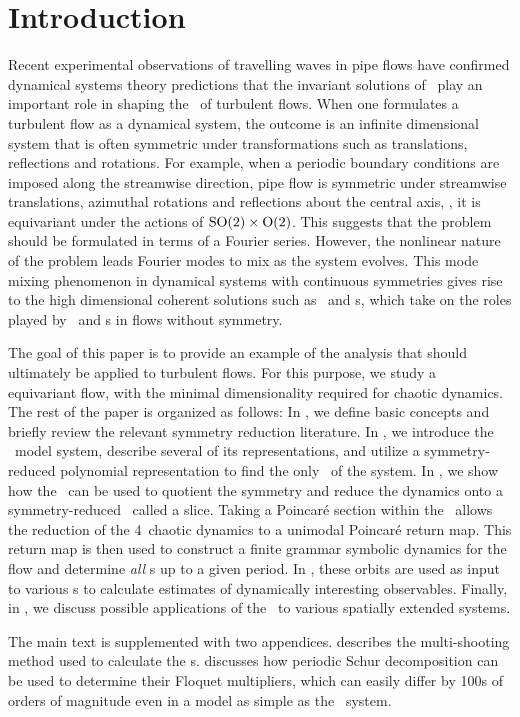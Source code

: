 \section{Introduction}
\label{s:intro}

Recent experimental observations of travelling waves in pipe flows have
confirmed dynamical systems theory predictions that the invariant
solutions of \NSe\ play an important role in shaping the \statesp\ of turbulent
flows. When one formulates a turbulent flow as a
dynamical system, the outcome is an infinite dimensional system that is often
symmetric under transformations such as translations,
reflections and rotations. For example, when a periodic boundary
conditions are imposed along the streamwise direction, pipe flow is symmetric
under streamwise translations, azimuthal rotations and reflections about
the central axis, \ie, it is equivariant under the actions of
$\textrm{SO}(2) \times \textrm{O}(2)$. This suggests that the problem should be formulated in
terms of a Fourier series. However, the nonlinear nature of the problem
leads Fourier modes to mix as the system evolves. This mode mixing phenomenon in 
dynamical systems with continuous symmetries gives rise to the high dimensional 
coherent solutions such as \reqva\ and \rpo s, which take on the roles 
played by \eqva\ and \po s in flows without symmetry.

The goal of this paper is to provide an example of the analysis that should
ultimately be applied to turbulent flows. For this purpose, we study
a \twomode\  equivariant flow, with the minimal dimensionality required 
for chaotic dynamics. The rest of the paper is organized as follows:
In , we define basic concepts and briefly review the relevant 
symmetry reduction literature. In , we introduce the \twomode\ 
model system, describe several of its representations, and
utilize a symmetry-reduced polynomial representation to find the only \reqv\
of the system. In , we show how the \mslices\ can be used to quotient 
the symmetry and reduce the dynamics onto a symmetry-reduced \statesp\ called a slice. Taking a Poincar\'e 
section within the \slice\ allows the reduction of the 4\dmn\ chaotic dynamics to a unimodal Poincar\'e
return map. This return map is then used to construct a finite grammar symbolic dynamics for
the flow and determine {\em all} \rpo s up to a given period. In \refsect{s:DynAvers},
these orbits are used as input to various {\cycForm s} to calculate estimates
of dynamically interesting observables. Finally, in \refsect{s:concl}, we discuss possible 
applications of the \mslices\ to various spatially extended systems. 

The main text is supplemented with two appendices. \refAppe{s:newton} describes the multi-shooting 
method used to calculate the \rpo s. 
\refAppe{s:schur} discusses how periodic Schur decomposition can be used to determine their Floquet 
multipliers, which can easily differ by 100s of orders of magnitude even in a model as simple as 
the \twomode\ system.
